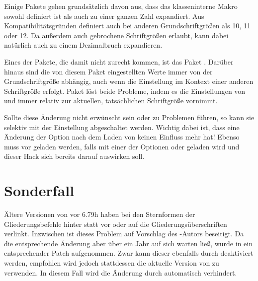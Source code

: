Einige Pakete gehen grundsätzlich davon aus, dass das klasseninterne Makro
 sowohl definiert ist als auch zu einer
ganzen Zahl expandiert. Aus Kompatibilitätsgründen definiert \KOMAScript{}
 auch bei anderen Grundschriftgrößen als 10,
11 oder 12. Da \KOMAScript{} außerdem auch gebrochene
Schriftgrößen erlaubt, kann dabei  natürlich auch zu einem
Dezimalbruch expandieren.

Eines der Pakete, die damit nicht zurecht
kommen, ist das Paket %
. Darüber hinaus sind die von diesem Paket
eingestellten Werte immer von der Grundschriftgröße abhängig, auch wenn die
Einstellung im Kontext einer anderen Schriftgröße erfolgt. Paket
 löst beide Probleme, indem es die Einstellungen von
 und  immer relativ zur aktuellen,
tatsächlichen Schriftgröße vornimmt.

Sollte diese Änderung nicht erwünscht sein oder zu Problemen führen, so kann
sie selektiv mit der Einstellung
abgeschaltet werden. Wichtig dabei ist, dass eine Änderung
der Option nach dem Laden von  keinen Einfluss mehr hat!
Ebenso muss  vor  geladen werden, falls
 mit einer der Optionen  oder
 geladen wird und dieser Hack sich bereits darauf
auswirken soll.


\section{Sonderfall }

Ältere Versionen von
 vor
6.79h haben bei den Sternformen der Gliederungsbefehle hinter statt vor oder
auf die Gliederungsüberschriften verlinkt. Inzwischen ist dieses Problem auf
Vorschlag des \KOMAScript-Autors beseitigt. Da die entsprechende Änderung aber
über ein Jahr auf sich warten ließ, wurde in  ein
entsprechender Patch aufgenommen. Zwar kann dieser ebenfalls durch
 deaktiviert werden, empfohlen wird jedoch
stattdessen die aktuelle Version von  zu verwenden. In
diesem Fall wird die Änderung durch  automatisch verhindert.


